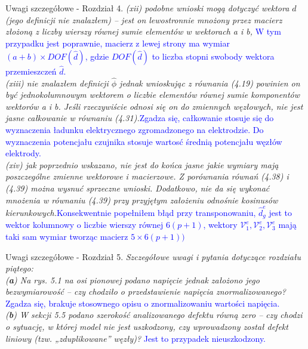 \documentclass[10pt,aspectratio=169]{beamer} %
\begin{document}
\begin{frame}[label=frame2]{Uwagi szczegółowe - Rozdział 4.}\justifying
\textit{(xii) podobne wnioski mogą dotyczyć wektora \(\hat{d}\) (jego definicji nie znalazłem) – jest on lewostronnie mnożony przez macierz złożoną z liczby wierszy równej sumie elementów w wektorach a i b,} \textcolor{blue}{W tym przypadku jest poprawnie, macierz z lewej strony ma wymiar \((a+b)\times DOF(\widehat{d})\), gdzie \(DOF(\widehat{d})\) to liczba stopni swobody wektora przemieszczeń \(\widehat{d}\).}\\
\textit{(xiii) nie znalazłem definicji \(\hat{\phi}\) jednak wnioskując z równania (4.19) powinien on być jednokolumnowym wektorem o liczbie elementów równej sumie komponentów wektorów a i b. Jeśli rzeczywiście odnosi się on do	zmiennych węzłowych, nie jest jasne całkowanie w równaniu (4.31).}\textcolor{blue}{Zgadza się, całkowanie stosuje się do wyznaczenia ładunku elektrycznego zgromadzonego na elektrodzie. Do wyznaczenia potencjału czujnika stosuje wartosć średnią potencjału węzłów elektrody.}\\
\textit{(xiv) jak poprzednio wskazano, nie jest do końca jasne jakie wymiary mają poszczególne zmienne wektorowe i macierzowe. Z porównania równań (4.38) i (4.39) można wysnuć sprzeczne wnioski. Dodatkowo, nie da się wykonać mnożenia w równaniu (4.39) przy przyjętym założeniu odnośnie kosinusów kierunkowych.}\textcolor{blue}{Konsekwentnie popełniłem błąd przy transponowaniu, \(\widehat{d}_g^e\) jest to wektor kolumnowy o liczbie wierszy równej \(6(p+1)\), wektory \(\mathcal{V}^e_1,\mathcal{V}^e_2,\mathcal{V}^e_3\) mają taki sam wymiar tworząc macierz \(5\times6(p+1))\)}
\end{frame}
\begin{frame}[label=frame4]{Uwagi szczegółowe - Rozdział 5.}\justifying
\textit{Szczegółowe uwagi i pytania dotyczące rozdziału piątego:\\
(\textbf{a}) Na rys. 5.1 na osi pionowej podano napięcie jednak założono jego bezwymiarowość – czy chodziło o przedstawienie napięcia znormalizowanego?} \textcolor{blue}{Zgadza się, brakuje stosownego opisu o znormalizowaniu wartości napięcia.}\\
\textit{(\textbf{b}) W sekcji 5.5 podano szerokość analizowanego defektu równą zero – czy chodzi o sytuację, w której model nie jest uszkodzony, czy wprowadzony został defekt liniowy	(tzw. „zduplikowane” węzły)?} \textcolor{blue}{Jest to przypadek nieuszkodzony.}
\end{frame}
\end{document}
